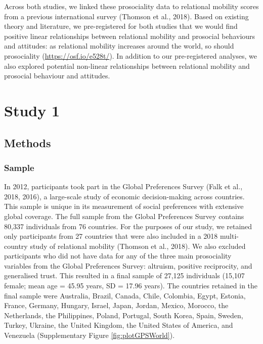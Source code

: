 \documentclass[
  man,floatsintext]{apa6}
\begin{document}
Across both studies, we linked these prosociality data to relational mobility scores from a previous international survey (Thomson et al., 2018). Based on existing theory and literature, we pre-registered for both studies that we would find positive linear relationships between relational mobility and prosocial behaviours and attitudes: as relational mobility increases around the world, so should prosociality (\url{https://osf.io/e528t/}). In addition to our pre-registered analyses, we also explored potential non-linear relationships between relational mobility and prosocial behaviour and attitudes.

\hypertarget{study-1}{%
\section{Study 1}\label{study-1}}

\hypertarget{methods}{%
\subsection{Methods}\label{methods}}

\hypertarget{sample}{%
\subsubsection{Sample}\label{sample}}

In 2012, participants took part in the Global Preferences Survey (Falk et al., 2018, 2016), a large-scale study of economic decision-making across countries. This sample is unique in its measurement of social preferences with extensive global coverage. The full sample from the Global Preferences Survey contains 80,337 individuals from 76 countries. For the purposes of our study, we retained only participants from 27 countries that were also included in a 2018 multi-country study of relational mobility (Thomson et al., 2018). We also excluded participants who did not have data for any of the three main prosociality variables from the Global Preferences Survey: altruism, positive reciprocity, and generalised trust. This resulted in a final sample of 27,125 individuals (15,107 female; mean age = 45.95 years, SD = 17.96 years). The countries retained in the final sample were Australia, Brazil, Canada, Chile, Colombia, Egypt, Estonia, France, Germany, Hungary, Israel, Japan, Jordan, Mexico, Morocco, the Netherlands, the Philippines, Poland, Portugal, South Korea, Spain, Sweden, Turkey, Ukraine, the United Kingdom, the United States of America, and Venezuela (Supplementary Figure \ref{fig:plotGPSWorld}).
\end{document}
